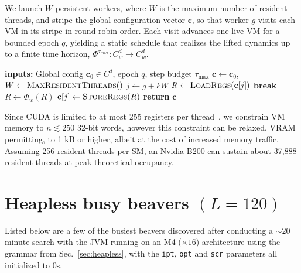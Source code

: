 \documentclass[sigplan,nonacm]{acmart}\settopmatter{printfolios=false,printccs=false,printacmref=false}
\begin{document}
We launch \(W\) persistent workers, where \(W\) is the maximum number of resident threads, and stripe the global configuration vector \(\mathbf c\), so that worker \(g\) visits each VM in its stripe in round-robin order. Each visit advances one live VM for a bounded epoch \(q\), yielding a static schedule that realizes the lifted dynamics up to a finite time horizon, \(\Phi^{\tau_{\max}}:C_w^d\to C_w^d\).
\vspace{-0.7cm}
\begin{algorithm}[H]
\caption{Striped round-robin RASP hypervisor}
\label{alg:hypervisor}
\small
\begin{algorithmic}[1]
\State \textbf{inputs:} Global config \(\mathbf c_0 \in C^d\), epoch \(q\), step budget \(\tau_{\max}\)
\State \(\mathbf c \gets \mathbf c_0\), \(W \gets \textsc{MaxResidentThreads}()\)
 
 
 
\State \(j \gets g + kW\) 
 
\State \(R \gets \textsc{LoadRegs}(\mathbf c[j])\)
 
 \textbf{break} \EndIf
\State \(R \gets \Phi_w(R)\) 
\EndFor
\State \(\mathbf c[j] \gets \textsc{StoreRegs}(R)\)
\EndIf
\EndFor
\EndFor
\EndFor
\State \textbf{return} \(\mathbf c\)
\end{algorithmic}
\end{algorithm}

\vspace{-0.5cm}
\noindent Since CUDA is limited to at most 255 registers per thread~\cite{nvidia2026cuda}, we constrain VM memory to $n \lesssim 250$ 32-bit words, however this constraint can be relaxed, VRAM permitting, to 1 kB or higher, albeit at the cost of increased memory traffic. Assuming 256 resident threads per SM, an Nvidia B200 can sustain about 37,888 resident threads at peak theoretical occupancy.

\section{Heapless busy beavers $(L=120)$}

Listed below are a few of the busiest beavers discovered after conducting a $\sim\!20$ minute search with the JVM running on an M4 ($\times 16$) architecture using the grammar from Sec.~\ref{sec:heapless}, with the \texttt{ipt}, \texttt{opt} and \texttt{scr} parameters all initialized to 0s. \hspace{-0.3cm}
\end{document}
